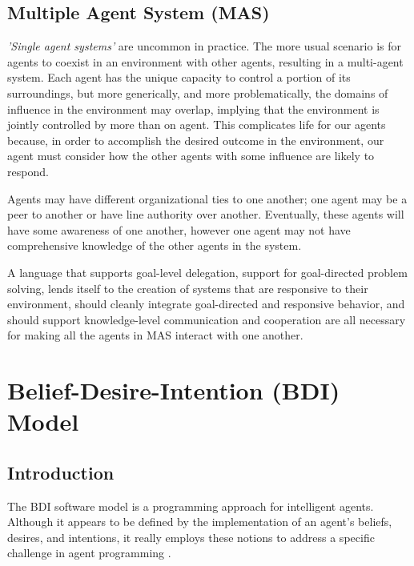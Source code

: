 \subsection{Multiple Agent System (MAS)}
\textit{'Single agent systems'} are uncommon in practice. The more usual scenario is for agents to coexist in an environment with other agents, resulting in a multi-agent system.
Each agent has the unique capacity to control a portion of its surroundings, but more generically, and more problematically, the domains of influence in the environment may overlap, implying that the environment is jointly controlled by more than on agent. This complicates life for our agents because, in order to accomplish the desired outcome in the environment, our agent must consider how the other agents with some influence are likely to respond.

\vspace{.5cm}

Agents may have different organizational ties to one another; one agent may be a peer to another or have line authority over another. Eventually, these agents will have some awareness of one another, however one agent may not have comprehensive knowledge of the other agents in the system.

\vspace{.5cm}

A language that supports goal-level delegation, support for goal-directed problem solving, lends itself to the creation of systems that are responsive to their environment, should cleanly integrate goal-directed and responsive behavior, and should support knowledge-level communication and cooperation are all necessary for making all the agents in MAS interact with one another.

\section{Belief-Desire-Intention (BDI) Model}

\subsection{Introduction}

The \ac{BDI} software model is a programming approach for intelligent agents. Although it appears to be defined by the implementation of an agent's beliefs, desires, and intentions, it really employs these notions to address a specific challenge in agent programming \cite{ap}. 

